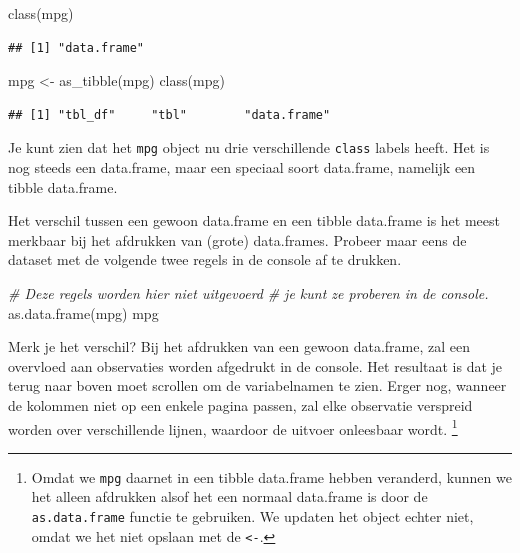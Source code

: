 \documentclass[]{tufte-book}
\newenvironment{Shaded}{}{}
\newcommand{\CommentTok}[1]{\textcolor[rgb]{0.38,0.63,0.69}{\textit{#1}}}
\newcommand{\FunctionTok}[1]{\textcolor[rgb]{0.02,0.16,0.49}{#1}}
\newcommand{\NormalTok}[1]{#1}
\newcommand{\OtherTok}[1]{\textcolor[rgb]{0.00,0.44,0.13}{#1}}
\begin{document}
\begin{Shaded}
\begin{Highlighting}[]
\FunctionTok{class}\NormalTok{(mpg)}
\end{Highlighting}
\end{Shaded}

\begin{verbatim}
## [1] "data.frame"
\end{verbatim}

\begin{Shaded}
\begin{Highlighting}[]
\NormalTok{mpg }\OtherTok{\textless{}{-}} \FunctionTok{as\_tibble}\NormalTok{(mpg)}
\FunctionTok{class}\NormalTok{(mpg)}
\end{Highlighting}
\end{Shaded}

\begin{verbatim}
## [1] "tbl_df"     "tbl"        "data.frame"
\end{verbatim}

Je kunt zien dat het \texttt{mpg} object nu drie verschillende \texttt{class} labels heeft. Het is nog steeds een data.frame, maar een speciaal soort data.frame, namelijk een tibble data.frame.

Het verschil tussen een gewoon data.frame en een tibble data.frame is het meest merkbaar bij het afdrukken van (grote) data.frames. Probeer maar eens de dataset met de volgende twee regels in de console af te drukken.

\begin{Shaded}
\begin{Highlighting}[]
\CommentTok{\# Deze regels worden hier niet uitgevoerd}
\CommentTok{\# je kunt ze proberen in de console.}
\FunctionTok{as.data.frame}\NormalTok{(mpg)}
\NormalTok{mpg}
\end{Highlighting}
\end{Shaded}

Merk je het verschil? Bij het afdrukken van een gewoon data.frame, zal een overvloed aan observaties worden afgedrukt in de console. Het resultaat is dat je terug naar boven moet scrollen om de variabelnamen te zien. Erger nog, wanneer de kolommen niet op een enkele pagina passen, zal elke observatie verspreid worden over verschillende lijnen, waardoor de uitvoer onleesbaar wordt. \footnote{Omdat we \texttt{mpg} daarnet in een tibble data.frame hebben veranderd, kunnen we het alleen afdrukken alsof het een normaal data.frame is door de \texttt{as.data.frame} functie te gebruiken. We updaten het object echter niet, omdat we het niet opslaan met de \texttt{\textless{}-}.}
\end{document}
